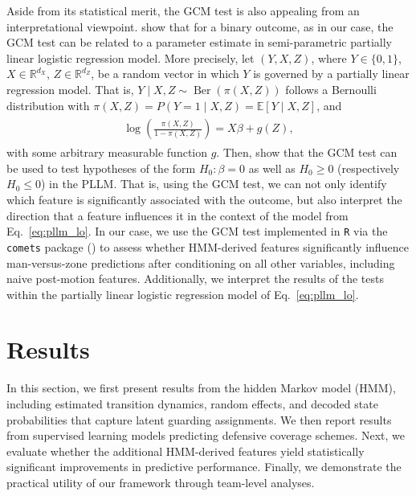 \documentclass[namedate,webpdf,modern,medium]{oup-authoring-template}
\newcommand{\given}{\mid}
\begin{document}
Aside from its statistical merit, the GCM test is also appealing from an interpretational viewpoint. \citet{bajons2025rGAX} show that for a binary outcome, as in our case, the GCM test can be related to a parameter estimate in semi-parametric partially linear logistic regression model.
More precisely, let $(Y, X, Z)$, where $Y \in \{0, 1\}$, $X \in \mathbb{R}^{d_X}$, $Z \in \mathbb{R}^{d_Z}$, be a random vector in which $Y$ is governed by a partially linear regression model. That is, $Y \given X, Z \sim \operatorname{Ber}(\pi(X,Z))$
follows a Bernoulli distribution with $\pi(X,Z) = P(Y=1 \mid X,Z) = \mathbb{E}[Y \given
X,Z]$, and 
\begin{align}
\label{eq:pllm_lo}
\begin{aligned}
\log\left(\frac{\pi(X,Z)}{1-\pi(X,Z)}\right) =
X\beta + g(Z),
\end{aligned}
\end{align}
with some arbitrary measurable function $g$. Then, \citet{bajons2025rGAX} show that the GCM test can be used to test hypotheses of the form $H_0: \beta = 0$ as well as $H_0 \ge 0$ (respectively $H_0 \le 0$) in the PLLM.  
That is, using the GCM test, we can not only identify which feature is significantly associated with the outcome, but also interpret the direction that a feature influences it in the context of the model from Eq.~\ref{eq:pllm_lo}. In our case, we use the GCM test implemented in \texttt{R} via the \texttt{comets} package (\citealp{kook24comets}) to assess whether HMM-derived features significantly influence man-versus-zone predictions after conditioning on all other variables, including naive post-motion features. Additionally, we interpret the results of the tests within the partially linear logistic regression model of Eq.~\ref{eq:pllm_lo}.

\section{Results}\label{sec:results}
In this section, we first present results from the hidden Markov model (HMM), including estimated transition dynamics, random effects, and decoded state probabilities that capture latent guarding assignments. We then report results from supervised learning models predicting defensive coverage schemes. Next, we evaluate whether the additional HMM-derived features yield statistically significant improvements in predictive performance. Finally, we demonstrate the practical utility of our framework through team-level analyses.
\end{document}
